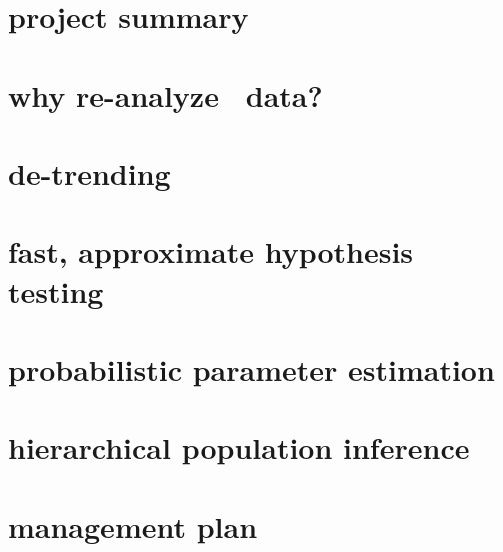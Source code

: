 \documentclass[letterpaper,12pt]{article}
\begin{document}
\section*{project summary}

\section{why re-analyze \Kepler\ data?}

\section{de-trending}

\section{fast, approximate hypothesis testing}

\section{probabilistic parameter estimation}

\section{hierarchical population inference}

\section{management plan}
\end{document}
